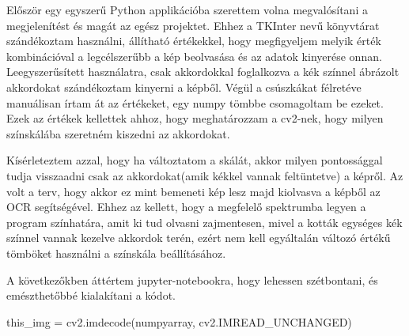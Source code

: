 
Először egy egyszerű Python applikációba szerettem volna megvalósítani a megjelenítést és magát az egész projektet. Ehhez a TKInter nevű könyvtárat szándékoztam használni, állítható értékekkel, hogy megfigyeljem melyik érték kombinációval a legcélszerűbb a kép beolvasása és az adatok kinyerése onnan. Leegyszerűsített használatra, csak akkordokkal foglalkozva a kék színnel ábrázolt akkordokat szándékoztam kinyerni a képből. Végül a csúszkákat félretéve manuálisan írtam át az értékeket, egy numpy tömbbe csomagoltam be ezeket. Ezek az értékek kellettek ahhoz, hogy meghatározzam a cv2-nek, hogy milyen színskálába szeretném kiszedni az akkordokat. 
\par
Kísérleteztem azzal, hogy ha változtatom a skálát, akkor milyen pontossággal tudja visszaadni csak az akkordokat(amik kékkel vannak feltüntetve) a képről. Az volt a terv, hogy akkor ez mint bemeneti kép lesz majd kiolvasva a képből az OCR segítségével. Ehhez az kellett, hogy a megfelelő spektrumba legyen a program színhatára, amit ki tud olvasni zajmentesen, mivel a kották egységes kék színnel vannak kezelve akkordok terén, ezért nem kell egyáltalán változó értékű tömböket használni a színskála beállításához.
\par

A következőkben áttértem jupyter-notebookra, hogy lehessen szétbontani, és emészthetőbbé kialakítani a kódot.

\begin{python}
this_img = cv2.imdecode(numpyarray, cv2.IMREAD_UNCHANGED)	
\end{python}



